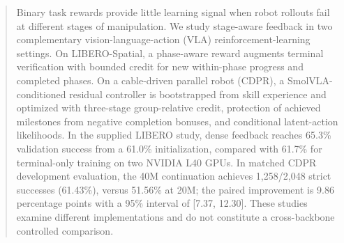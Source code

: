 \begin{abstract}
Binary task rewards provide little learning signal when robot rollouts fail at different stages of manipulation. We study stage-aware feedback in two complementary vision-language-action (VLA) reinforcement-learning settings. On LIBERO-Spatial, a phase-aware reward augments terminal verification with bounded credit for new within-phase progress and completed phases. On a cable-driven parallel robot (CDPR), a SmolVLA-conditioned residual controller is bootstrapped from skill experience and optimized with three-stage group-relative credit, protection of achieved milestones from negative completion bonuses, and conditional latent-action likelihoods. In the supplied LIBERO study, dense feedback reaches 65.3\% validation success from a 61.0\% initialization, compared with 61.7\% for terminal-only training on two NVIDIA L40 GPUs. In matched CDPR development evaluation, the 40M continuation achieves 1,258/2,048 strict successes (61.43\%), versus 51.56\% at 20M; the paired improvement is 9.86 percentage points with a 95\% interval of [7.37, 12.30]. These studies examine different implementations and do not constitute a cross-backbone controlled comparison. 
\end{abstract}

